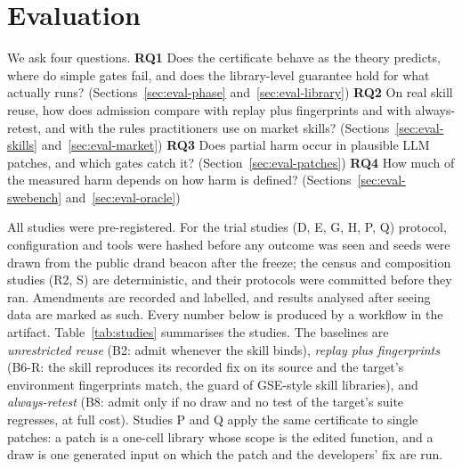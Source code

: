 \section{Evaluation}
\label{sec:evaluation}

We ask four questions.  \textbf{RQ1} Does the certificate behave as the theory predicts, where do simple gates fail, and does the library-level
guarantee hold for what actually runs? (Sections~\ref{sec:eval-phase} and~\ref{sec:eval-library})  \textbf{RQ2} On real skill reuse, how does admission compare with replay plus fingerprints and with
always-retest, and with the rules practitioners use on market skills? (Sections~\ref{sec:eval-skills} and~\ref{sec:eval-market})  \textbf{RQ3} Does partial harm occur in plausible LLM patches, and which gates catch
it? (Section~\ref{sec:eval-patches})  \textbf{RQ4} How much of the measured harm depends on how harm is defined?
(Sections~\ref{sec:eval-swebench} and~\ref{sec:eval-oracle})

All studies were pre-registered.  For the trial studies (D, E, G, H, P, Q) protocol, configuration and tools were hashed before
any outcome was seen and seeds were drawn from the public drand beacon after the freeze; the census and composition studies
(R2, S) are deterministic, and their protocols were committed before they ran.  Amendments are recorded and labelled, and results
analysed after seeing data are marked as such.  Every number below is produced by a workflow in the artifact.
Table~\ref{tab:studies} summarises the studies.  The baselines are \emph{unrestricted reuse} (B2: admit whenever the skill
binds), \emph{replay plus fingerprints} (B6-R: the skill reproduces its recorded fix on its source and the target's environment
fingerprints match, the guard of GSE-style skill libraries), and \emph{always-retest} (B8: admit only if no draw and no test of the
target's suite regresses, at full cost).  Studies P and Q apply the same certificate to single patches: a patch is a one-cell
library whose scope is the edited function, and a draw is one generated input on which the patch and the developers' fix are run.

